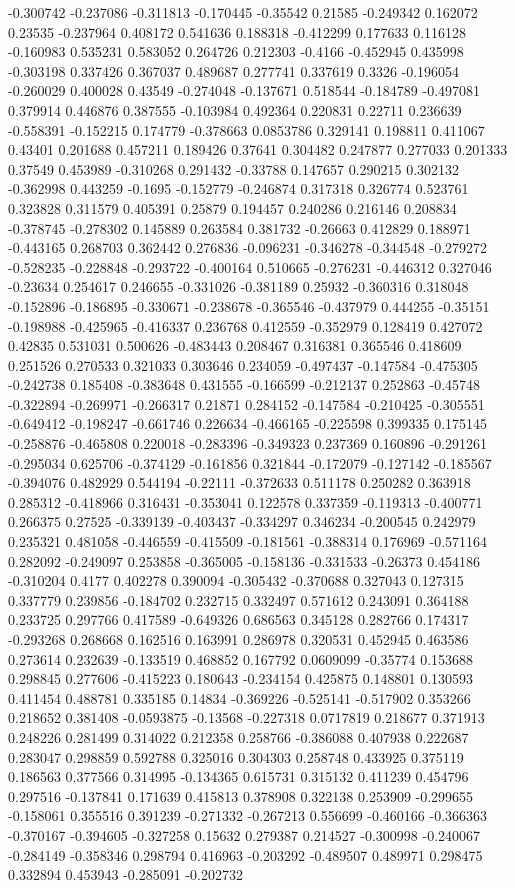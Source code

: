 -0.300742 -0.237086 -0.311813 -0.170445 -0.35542 0.21585 -0.249342 0.162072 0.23535 -0.237964 0.408172 0.541636 0.188318 -0.412299 0.177633 0.116128 -0.160983 0.535231 0.583052 0.264726 0.212303 -0.4166 -0.452945 0.435998 -0.303198 0.337426 0.367037 0.489687 0.277741 0.337619 0.3326 -0.196054 -0.260029 0.400028 0.43549 -0.274048 -0.137671 0.518544 -0.184789 -0.497081 0.379914 0.446876 0.387555 -0.103984 0.492364 0.220831 0.22711 0.236639 -0.558391 -0.152215 0.174779 -0.378663 0.0853786 0.329141 0.198811 0.411067 0.43401 0.201688 0.457211 0.189426 0.37641 0.304482 0.247877 0.277033 0.201333 0.37549 0.453989 -0.310268 0.291432 -0.33788 0.147657 0.290215 0.302132 -0.362998 0.443259 -0.1695 -0.152779 -0.246874 0.317318 0.326774 0.523761 0.323828 0.311579 0.405391 0.25879 0.194457 0.240286 0.216146 0.208834 -0.378745 -0.278302 0.145889 0.263584 0.381732 -0.26663 0.412829 0.188971 -0.443165 0.268703 0.362442 0.276836 -0.096231 -0.346278 -0.344548 -0.279272 -0.528235 -0.228848 -0.293722 -0.400164 0.510665 -0.276231 -0.446312 0.327046 -0.23634 0.254617 0.246655 -0.331026 -0.381189 0.25932 -0.360316 0.318048 -0.152896 -0.186895 -0.330671 -0.238678 -0.365546 -0.437979 0.444255 -0.35151 -0.198988 -0.425965 -0.416337 0.236768 0.412559 -0.352979 0.128419 0.427072 0.42835 0.531031 0.500626 -0.483443 0.208467 0.316381 0.365546 0.418609 0.251526 0.270533 0.321033 0.303646 0.234059 -0.497437 -0.147584 -0.475305 -0.242738 0.185408 -0.383648 0.431555 -0.166599 -0.212137 0.252863 -0.45748 -0.322894 -0.269971 -0.266317 0.21871 0.284152 -0.147584 -0.210425 -0.305551 -0.649412 -0.198247 -0.661746 0.226634 -0.466165 -0.225598 0.399335 0.175145 -0.258876 -0.465808 0.220018 -0.283396 -0.349323 0.237369 0.160896 -0.291261 -0.295034 0.625706 -0.374129 -0.161856 0.321844 -0.172079 -0.127142 -0.185567 -0.394076 0.482929 0.544194 -0.22111 -0.372633 0.511178 0.250282 0.363918 0.285312 -0.418966 0.316431 -0.353041 0.122578 0.337359 -0.119313 -0.400771 0.266375 0.27525 -0.339139 -0.403437 -0.334297 0.346234 -0.200545 0.242979 0.235321 0.481058 -0.446559 -0.415509 -0.181561 -0.388314 0.176969 -0.571164 0.282092 -0.249097 0.253858 -0.365005 -0.158136 -0.331533 -0.26373 0.454186 -0.310204 0.4177 0.402278 0.390094 -0.305432 -0.370688 0.327043 0.127315 0.337779 0.239856 -0.184702 0.232715 0.332497 0.571612 0.243091 0.364188 0.233725 0.297766 0.417589 -0.649326 0.686563 0.345128 0.282766 0.174317 -0.293268 0.268668 0.162516 0.163991 0.286978 0.320531 0.452945 0.463586 0.273614 0.232639 -0.133519 0.468852 0.167792 0.0609099 -0.35774 0.153688 0.298845 0.277606 -0.415223 0.180643 -0.234154 0.425875 0.148801 0.130593 0.411454 0.488781 0.335185 0.14834 -0.369226 -0.525141 -0.517902 0.353266 0.218652 0.381408 -0.0593875 -0.13568 -0.227318 0.0717819 0.218677 0.371913 0.248226 0.281499 0.314022 0.212358 0.258766 -0.386088 0.407938 0.222687 0.283047 0.298859 0.592788 0.325016 0.304303 0.258748 0.433925 0.375119 0.186563 0.377566 0.314995 -0.134365 0.615731 0.315132 0.411239 0.454796 0.297516 -0.137841 0.171639 0.415813 0.378908 0.322138 0.253909 -0.299655 -0.158061 0.355516 0.391239 -0.271332 -0.267213 0.556699 -0.460166 -0.366363 -0.370167 -0.394605 -0.327258 0.15632 0.279387 0.214527 -0.300998 -0.240067 -0.284149 -0.358346 0.298794 0.416963 -0.203292 -0.489507 0.489971 0.298475 0.332894 0.453943 -0.285091 -0.202732 